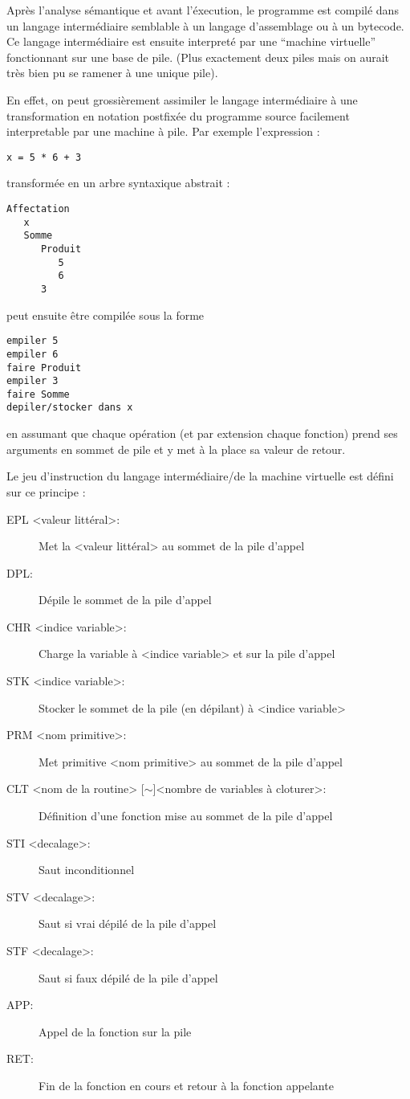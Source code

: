 Après l'analyse sémantique et avant l'éxecution, le programme est compilé dans un
langage intermédiaire semblable à un langage d'assemblage ou à un bytecode. Ce
langage intermédiaire est ensuite interpreté par une ``machine virtuelle''
fonctionnant sur une base de pile. (Plus exactement deux piles mais on aurait très
bien pu se ramener à une unique pile).

En effet, on peut grossièrement assimiler le langage intermédiaire à une transformation
en notation postfixée du programme source facilement interpretable par une machine à pile.
Par exemple l'expression :
\begin{verbatim}
x = 5 * 6 + 3
\end{verbatim}
transformée en un arbre syntaxique abstrait :
\begin{verbatim}
Affectation
   x
   Somme
      Produit
         5
         6
      3
\end{verbatim}
peut ensuite être compilée sous la forme
\begin{verbatim}
empiler 5
empiler 6
faire Produit
empiler 3
faire Somme
depiler/stocker dans x
\end{verbatim}
en assumant que chaque opération (et par extension chaque fonction) prend
ses arguments en sommet de pile et y met à la place sa valeur de retour.

\hfill\break
Le jeu d'instruction du langage intermédiaire/de la machine virtuelle est défini
sur ce principe :
\begin{description}
   \item[EPL <valeur littéral>:] Met la <valeur littéral> au sommet de la pile d'appel
   \item[DPL:] Dépile le sommet de la pile d'appel
   \item[CHR <indice variable>:] Charge la variable à <indice variable> et sur la pile d'appel
   \item[STK <indice variable>:] Stocker le sommet de la pile (en dépilant) à <indice variable>
   \item[PRM <nom primitive>:] Met primitive <nom primitive> au sommet de la pile d'appel
   \item[CLT <nom de la routine> {[$\sim$]}<nombre de variables à cloturer>:] Définition d'une fonction
   mise au sommet de la pile d'appel
   \item[STI <decalage>:] Saut inconditionnel
   \item[STV <decalage>:] Saut si vrai dépilé de la pile d'appel
   \item[STF <decalage>:] Saut si faux dépilé de la pile d'appel
   \item[APP:] Appel de la fonction sur la pile
   \item[RET:] Fin de la fonction en cours et retour à la fonction appelante
\end{description}

